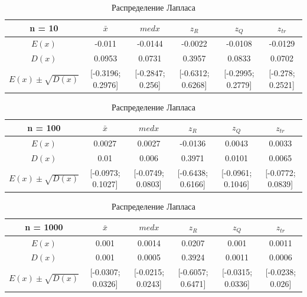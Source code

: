 \documentclass[12pt]{article}
\begin{document}
\begin{center}
\begin{table}
\caption{Распределение Лапласа}
\begin{adjustbox}{width=\textwidth}
\begin{tabular}{| c | c | c | c | c | c |}
\hline
n = 10 & $\bar{x}$ & $med x$ & $z_R$ & $z_Q$ & $z_{tr}$ \\\hline
$E(x)$ & -0.011 & -0.0144 & -0.0022 & -0.0108 & -0.0129 \\\hline
$D(x)$ & 0.0953 & 0.0731 & 0.3957 & 0.0833 & 0.0702 \\\hline
$E(x) \pm \sqrt{D(x)}$ & [-0.3196; 0.2976] & [-0.2847; 0.256] & [-0.6312; 0.6268] & [-0.2995; 0.2779] & [-0.278; 0.2521]\\\hline
\end{tabular}
\end{adjustbox}

\begin{adjustbox}{width=\textwidth}
\begin{tabular}{| c | c | c | c | c | c |}
\hline
n = 100 & $\bar{x}$ & $med x$ & $z_R$ & $z_Q$ & $z_{tr}$ \\\hline
$E(x)$ & 0.0027 & 0.0027 & -0.0136 & 0.0043 & 0.0033 \\\hline
$D(x)$ & 0.01 & 0.006 & 0.3971 & 0.0101 & 0.0065 \\\hline
$E(x) \pm \sqrt{D(x)}$ & [-0.0973; 0.1027] & [-0.0749; 0.0803] & [-0.6438; 0.6166] & [-0.0961; 0.1046] & [-0.0772; 0.0839]\\\hline
\end{tabular}
\end{adjustbox}

\begin{adjustbox}{width=\textwidth}
\begin{tabular}{| c | c | c | c | c | c |}
\hline
n = 1000 & $\bar{x}$ & $med x$ & $z_R$ & $z_Q$ & $z_{tr}$ \\\hline
$E(x)$ & 0.001 & 0.0014 & 0.0207 & 0.001 & 0.0011 \\\hline
$D(x)$ & 0.001 & 0.0005 & 0.3924 & 0.0011 & 0.0006 \\\hline
$E(x) \pm \sqrt{D(x)}$ & [-0.0307; 0.0326] & [-0.0215; 0.0243] & [-0.6057; 0.6471] & [-0.0315; 0.0336] & [-0.0238; 0.026]\\\hline
\end{tabular}
\end{adjustbox}

\end{table}


\end{center}
\end{document}
